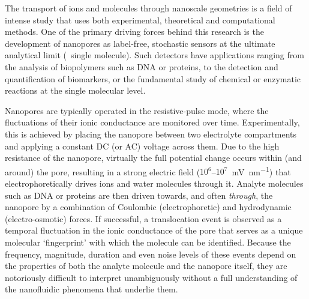 \documentclass[journal=ancac3,manuscript=article,etalmode=truncate,maxauthors=0,layout=onecolumn]{achemso}
\begin{document}
The transport of ions and molecules through nanoscale geometries is a field of intense study that uses both
experimental, theoretical and computational methods.\cite{Sparreboom-2010,Bocquet-2010,Maffeo-2012,
Thomas-2014,Wang-2014,Kim-2015} One of the primary driving forces behind this research is the development of
nanopores as label-free, stochastic sensors at the ultimate analytical limit (\ie{}~single molecule).
\cite{Bayley-2001,Dekker-2007,Venkatesan-2011,Zhang-2016} Such detectors have applications ranging from the
analysis of biopolymers such as
DNA\cite{Deamer-2016,Kasianowicz-1996,Meller-2000,Maglia-2008,Butler-2008,Stoddart-2009,Franceschini-2013,Jain-2018}
or proteins,\cite{Restrepo-Perez-2018,Talaga-2009,Rodriguez-Larrea-2013, Nivala-2013,Kennedy-2016} to the
detection and quantification of
biomarkers,\cite{Chen-2013,Soskine-2012,Niedzwiecki-2013,VanMeervelt-2014,Huang-2017,Liu-2018,Galenkamp-2018}
or the fundamental study of chemical or enzymatic reactions at the single molecular
level.\cite{Willems-VanMeervelt-2017,Lieberman-2010, Nivala-2013,Ho-2015,Laszlo-2017}

Nanopores are typically operated in the resistive-pulse mode, where the fluctuations of their ionic
conductance are monitored over time.\cite{Bayley-2001,Dekker-2007,Maglia-2010,Venkatesan-2011} Experimentally,
this is achieved by placing the nanopore between two electrolyte compartments and applying a constant DC (or
AC) voltage across them. Due to the high resistance of the nanopore, virtually the full potential change
occurs within (and around) the pore, resulting in a strong electric field ($10^6$--$10^7$~\si{\mV\per\nm})
that electrophoretically drives ions and water molecules through
it.\cite{Wong-2007,Mao-2014,Haywood-2014,Laohakunakorn-2015} Analyte molecules such as DNA or proteins are
then driven towards, and often \emph{through}, the nanopore by a combination of Coulombic (electrophoretic)
and hydrodynamic (electro-osmotic) forces.\cite{Wong-2007,Grosberg-2010,Muthukumar-2010, Muthukumar-2014} If
successful, a translocation event is observed as a temporal fluctuation in the ionic conductance of the pore
that serves as a unique molecular `fingerprint' with which the molecule can be identified.\cite{Yusko-2017}
Because the frequency, magnitude, duration and even noise levels\cite{Yusko-2017,Houghtaling-2019} of these
events depend on the properties of both the analyte molecule and the nanopore itself, they are notoriously
difficult to interpret unambiguously without a full understanding of the nanofluidic phenomena that underlie
them.
\end{document}

